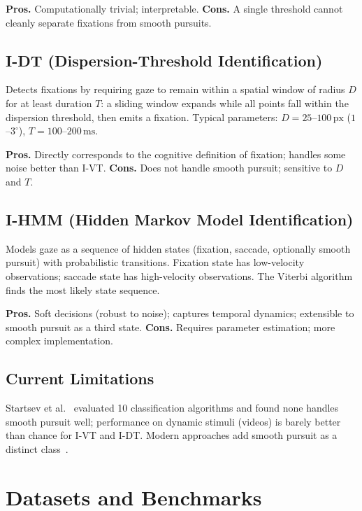 \documentclass[11pt,a4paper]{article}
\begin{document}
\textbf{Pros.} Computationally trivial; interpretable. \textbf{Cons.} A single threshold cannot cleanly separate fixations from smooth pursuits.

\subsection{I-DT (Dispersion-Threshold Identification)}

Detects fixations by requiring gaze to remain within a spatial window of radius $D$ for at least duration $T$:
a sliding window expands while all points fall within the dispersion threshold, then emits a fixation.
Typical parameters: $D = 25$--$100\,\text{px}$ ($1$--$3^\circ$), $T = 100$--$200\,\text{ms}$.

\textbf{Pros.} Directly corresponds to the cognitive definition of fixation; handles some noise better than I-VT. \textbf{Cons.} Does not handle smooth pursuit; sensitive to $D$ and $T$.

\subsection{I-HMM (Hidden Markov Model Identification)}

Models gaze as a sequence of hidden states (fixation, saccade, optionally smooth pursuit) with probabilistic transitions.
Fixation state has low-velocity observations; saccade state has high-velocity observations.
The Viterbi algorithm finds the most likely state sequence.

\textbf{Pros.} Soft decisions (robust to noise); captures temporal dynamics; extensible to smooth pursuit as a third state. \textbf{Cons.} Requires parameter estimation; more complex implementation.

\subsection{Current Limitations}

Startsev et al.~\cite{startsev2017one} evaluated 10 classification algorithms and found none handles smooth pursuit well; performance on dynamic stimuli (videos) is barely better than chance for I-VT and I-DT.
Modern approaches add smooth pursuit as a distinct class~\cite{eyemovement_review2022}.

\section{Datasets and Benchmarks}
\label{sec:datasets}
\end{document}
